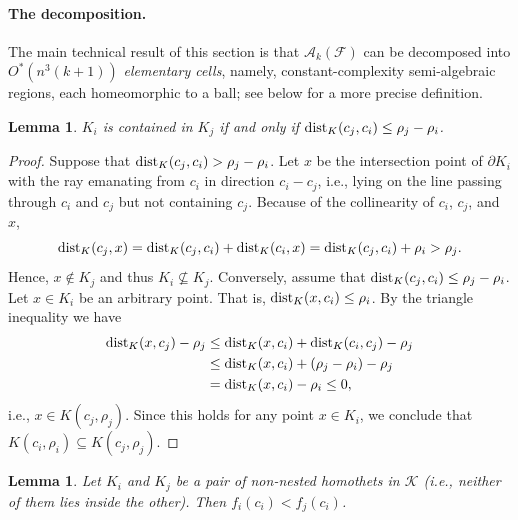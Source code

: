 \documentclass[11pt]{article}
\newif\iffullver
\def\reals{{\mathbb R}}
\def\bd{{\partial}}
\def\dist{{\rm dist}}
\def\A{\mathcal{A}}
\def\F{\mathcal{F}}
\def\K{\mathcal{K}}
\newtheorem{lemma}[theorem]{Lemma}
\theoremstyle{definition}
\begin{document}
\paragraph{The decomposition.}
\fi
The main technical result of this section is that $\A_k(\F)$ can be decomposed into 
$O^*(n^3(k+1))$ \emph{elementary cells}, namely, constant-complexity semi-algebraic regions, 
each homeomorphic to a ball; see below for a more precise definition.
%
\iffullver
\begin{lemma}
\label{lem:nested}
$K_i$ is contained in $K_j$ if and only if $\dist_K(c_j,c_i) \le \rho_j -\rho_i$.
\end{lemma}
\begin{proof}
Suppose that $\dist_K(c_j,c_i) > \rho_j -\rho_i$. Let $x$ be the intersection point of 
$\bd K_i$ with the ray emanating from $c_i$ in direction $c_i-c_j$, i.e., lying on the 
line passing through $c_i$ and $c_j$ but not containing $c_j$. Because of the collinearity 
of $c_i$, $c_j$, and $x$,
\[ 
\dist_K(c_j, x) = \dist_K(c_j,c_i) + \dist_K(c_i,x) = \dist_K(c_j,c_i)+\rho_i > \rho_j.
\]
Hence, $x\not\in K_j$ and thus $K_i \not\subseteq K_j$. Conversely, assume 
that $\dist_K(c_j,c_i) \le \rho_j -\rho_i$.
Let $x\in K_i$ be an arbitrary point. That is, $\dist_K(x,c_i) \le \rho_i$.
By the triangle inequality we have
\begin{align*} 
	\dist_K(x,c_j) - \rho_j & \le \dist_K(x,c_i) + \dist_K(c_i,c_j) - \rho_j \\
		& \le \dist_K(x,c_i) + (\rho_j - \rho_i) - \rho_j \\
		& = \dist_K(x,c_i) - \rho_i \le 0,
\end{align*}
i.e., $x\in K(c_j,\rho_j)$. Since this holds for any point $x\in K_i$, we conclude that
$K(c_i,\rho_i) \subseteq K(c_j,\rho_j)$.
\end{proof}
%
\begin{lemma} \label{lem:c0in}
	Let $K_i$ and $K_j$ be a pair of non-nested homothets in $\K$ (i.e., neither of them lies inside the other). Then $f_i(c_i) < f_j(c_i)$.
\end{lemma}
\end{document}

